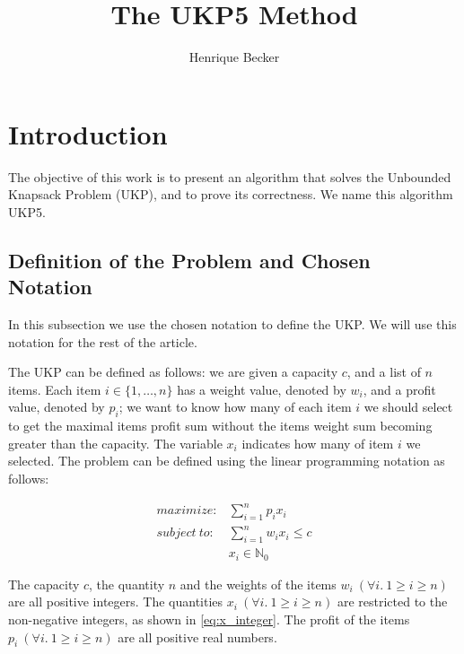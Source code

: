 \documentclass[12pt]{article}
\title{The UKP5 Method}
\author{Henrique Becker\inst{1}}
\begin{document}
 

\maketitle

\section{Introduction}

The objective of this work is to present an algorithm that solves the Unbounded Knapsack Problem (UKP), and to prove its correctness. We name this algorithm UKP5.

\subsection{Definition of the Problem and Chosen Notation}

In this subsection we use the chosen notation to define the UKP. We will use this notation for the rest of the article.

The UKP can be defined as follows: we are given a capacity \(c\), and a list of \(n\) items. Each item \(i \in \{1, \ldots, n\}\) has a weight value, denoted by \(w_i\), and a profit value, denoted by \(p_i\); we want to know how many of each item \(i\) we should select to get the maximal items profit sum without the items weight sum becoming greater than the capacity. The variable \(x_i\) indicates how many of item \(i\) we selected. The problem can be defined using the linear programming notation as follows:

\begin{align}
  maximize: &\sum_{i=1}^n p_i x_i\label{eq:objfun}\\
subject~to: &\sum_{i=1}^n w_i x_i \leq c\label{eq:capcons}\\
            &x_i \in \mathbb{N}_0\label{eq:x_integer}
\end{align}

The capacity \(c\), the quantity \(n\) and the weights of the items \(w_i~(\forall i.~1 \geq i \geq n)\) are all positive integers. The quantities \(x_i~(\forall i.~1 \geq i \geq n)\) are restricted to the non-negative integers, as shown in \eqref{eq:x_integer}. The profit of the items \(p_i~(\forall i.~1 \geq i \geq n)\) are all positive real numbers.

\end{document}
